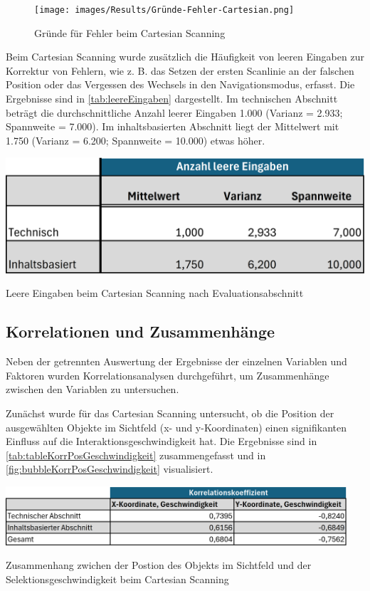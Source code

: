\begin{figure}[tbh]
    \centering
    \texttt{[image: images/Results/Gründe-Fehler-Cartesian.png]}
    \caption{Gründe für Fehler beim Cartesian Scanning}
    \label{fig:gründeFehlerCartesian}
\end{figure}

Beim Cartesian Scanning wurde zusätzlich die Häufigkeit von leeren Eingaben zur Korrektur von Fehlern, wie z. B. das Setzen der ersten Scanlinie an der falschen Position oder das Vergessen des Wechsels in den Navigationsmodus, erfasst. Die Ergebnisse sind in \autoref{tab:leereEingaben} dargestellt. 
Im technischen Abschnitt beträgt die durchschnittliche Anzahl leerer Eingaben 1.000 (Varianz = 2.933; Spannweite = 7.000). Im inhaltsbasierten Abschnitt liegt der Mittelwert mit 1.750 (Varianz = 6.200; Spannweite = 10.000) etwas höher.

\begin{table}[tbh]
    \centering
    \includegraphics{images/Results/leereEingaben.png}
    \caption{Leere Eingaben beim Cartesian Scanning nach Evaluationsabschnitt}
    \label{tab:leereEingaben}
\end{table}

\subsection{Korrelationen und Zusammenhänge}

Neben der getrennten Auswertung der Ergebnisse der einzelnen Variablen und Faktoren wurden Korrelationsanalysen durchgeführt, um Zusammenhänge zwischen den Variablen zu untersuchen.

Zunächst wurde für das Cartesian Scanning untersucht, ob die Position der ausgewählten Objekte im Sichtfeld (x- und y-Koordinaten) einen signifikanten Einfluss auf die Interaktionsgeschwindigkeit hat. Die Ergebnisse sind in \autoref{tab:tableKorrPosGeschwindigkeit} zusammengefasst und in \autoref{fig:bubbleKorrPosGeschwindigkeit} visualisiert. 

\begin{table}[tbh]
    \centering
    \includegraphics[width=0.95\textwidth]{images/Results/Korrelation-Position-Geschwindigkeit-Table.png}
    \caption{Zusammenhang zwichen der Postion des Objekts im Sichtfeld und der Selektionsgeschwindigkeit beim Cartesian Scanning}
    \label{tab:tableKorrPosGeschwindigkeit}
\end{table}

